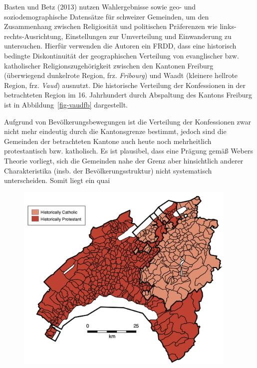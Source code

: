 \documentclass[
  a4paper,
  DIV=11,
  oneside]{scrreprt}
\begin{document}
Basten und Betz (2013) nutzen Wahlergebnisse sowie geo- und
soziodemographische Datensätze für schweizer Gemeinden, um den
Zusammenhang zwischen Religiosität und politischen Präferenzen wie
links-rechts-Ausrichtung, Einstellungen zur Umverteilung und
Einwanderung zu untersuchen. Hierfür verwenden die Autoren ein FRDD,
dass eine historisch bedingte Diskontinuität der geographischen
Verteilung von evanglischer bzw. katholischer Religionszugehörigkeit
zwischen den Kantonen Freiburg (überwiegend dunkelrote Region, frz.
\emph{Fribourg}) und Waadt (kleinere hellrote Region, frz. \emph{Vaud})
ausnutzt. Die historische Verteilung der Konfessionen in der
betrachteten Region im 16. Jahrhundert durch Abspaltung des Kantons
Freiburg ist in Abbildung~\ref{fig-vaudfb} dargestellt.

Aufgrund von Bevölkerungsbewegungen ist die Verteilung der Konfessionen
zwar nicht mehr eindeutig durch die Kantonsgrenze bestimmt, jedoch sind
die Gemeinden der betrachteten Kantone auch heute noch mehrheitlich
protestantisch bzw. katholisch. Es ist plausibel, dass eine Prägung
gemäß Webers Theorie vorliegt, sich die Gemeinden nahe der Grenz aber
hinsichtlich anderer Charakteristika (insb. der Bevölkerungsstruktur)
nicht systematisch unterscheiden. Somit liegt ein quai

\begin{figure}[t]


{\centering \includegraphics[width=4.16667in,height=\textheight]{img/WaadtFribourg.png}

}

\end{figure}
\end{document}
